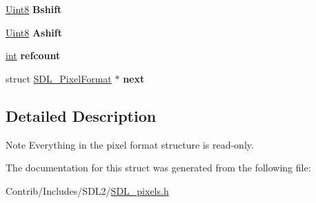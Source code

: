 \begin{DoxyCompactItemize}
\item 
\hyperlink{_s_d_l__stdinc_8h_a2944638813a090aa23e62f4da842c3e2}{Uint8} {\bfseries Bshift}\hypertarget{struct_s_d_l___pixel_format_ab91169d28e0ed13ea564a21fd08440d5}{}\label{struct_s_d_l___pixel_format_ab91169d28e0ed13ea564a21fd08440d5}

\item 
\hyperlink{_s_d_l__stdinc_8h_a2944638813a090aa23e62f4da842c3e2}{Uint8} {\bfseries Ashift}\hypertarget{struct_s_d_l___pixel_format_ae566d85cf2c4eae814322dfec60d8647}{}\label{struct_s_d_l___pixel_format_ae566d85cf2c4eae814322dfec60d8647}

\item 
\hyperlink{_s_d_l__thread_8h_a6a64f9be4433e4de6e2f2f548cf3c08e}{int} {\bfseries refcount}\hypertarget{struct_s_d_l___pixel_format_a6022c8a609170c7365fb96e83cb2df48}{}\label{struct_s_d_l___pixel_format_a6022c8a609170c7365fb96e83cb2df48}

\item 
struct \hyperlink{struct_s_d_l___pixel_format}{S\+D\+L\+\_\+\+Pixel\+Format} $\ast$ {\bfseries next}\hypertarget{struct_s_d_l___pixel_format_ac7e2744f93a892694f8d360c341c2a3f}{}\label{struct_s_d_l___pixel_format_ac7e2744f93a892694f8d360c341c2a3f}

\end{DoxyCompactItemize}


\subsection{Detailed Description}
\begin{DoxyNote}{Note}
Everything in the pixel format structure is read-\/only. 
\end{DoxyNote}


The documentation for this struct was generated from the following file\+:\begin{DoxyCompactItemize}
\item 
Contrib/\+Includes/\+S\+D\+L2/\hyperlink{_s_d_l__pixels_8h}{S\+D\+L\+\_\+pixels.\+h}\end{DoxyCompactItemize}
